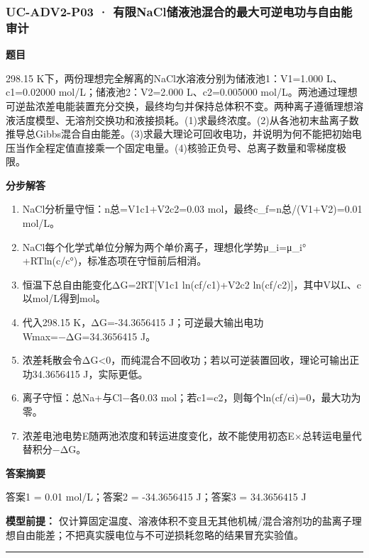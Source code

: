 \documentclass[UTF8,11pt,a4paper]{ctexart}
\begin{document}
\subsubsection*{UC-ADV2-P03 · 有限NaCl储液池混合的最大可逆电功与自由能审计}
\noindent\textbf{题目}\par
298.15 K下，两份理想完全解离的NaCl水溶液分别为储液池1：V1=1.000 L、c1=0.02000 mol/L；储液池2：V2=2.000 L、c2=0.005000 mol/L。两池通过理想可逆盐浓差电能装置充分交换，最终均匀并保持总体积不变。两种离子遵循理想溶液活度模型、无溶剂交换功和液接损耗。(1)求最终浓度。(2)从各池初末盐离子数推导总Gibbs混合自由能差。(3)求最大理论可回收电功，并说明为何不能把初始电压当作全程定值直接乘一个固定电量。(4)核验正负号、总离子数量和零梯度极限。\par
\medskip\noindent\textbf{分步解答}
\begin{enumerate}
\item NaCl分析量守恒：n总=V1c1+V2c2=0.03 mol，最终c\_f=n总/(V1+V2)=0.01 mol/L。
\item NaCl每个化学式单位分解为两个单价离子，理想化学势μ\_i=μ\_i°+RTln(c/c°)，标准态项在守恒前后相消。
\item 恒温下总自由能变化ΔG=2RT[V1c1 ln(cf/c1)+V2c2 ln(cf/c2)]，其中V以L、c以mol/L得到mol。
\item 代入298.15 K，ΔG=-34.3656415 J；可逆最大输出电功Wmax=−ΔG=34.3656415 J。
\item 浓差耗散会令ΔG<0，而纯混合不回收功；若以可逆装置回收，理论可输出正功34.3656415 J，实际更低。
\item 离子守恒：总Na+与Cl−各0.03 mol；若c1=c2，则每个ln(cf/ci)=0，最大功为零。
\item 浓差电池电势E随两池浓度和转运进度变化，故不能使用初态E×总转运电量代替积分−ΔG。
\end{enumerate}
\noindent\textbf{答案摘要}\par
答案1 = 0.01 mol/L；答案2 = -34.3656415 J；答案3 = 34.3656415 J\par
\noindent\textbf{模型前提：}
仅计算固定温度、溶液体积不变且无其他机械/混合溶剂功的盐离子理想自由能差；不把真实膜电位与不可逆损耗忽略的结果冒充实验值。\par
\medskip\hrule\medskip
\end{document}
